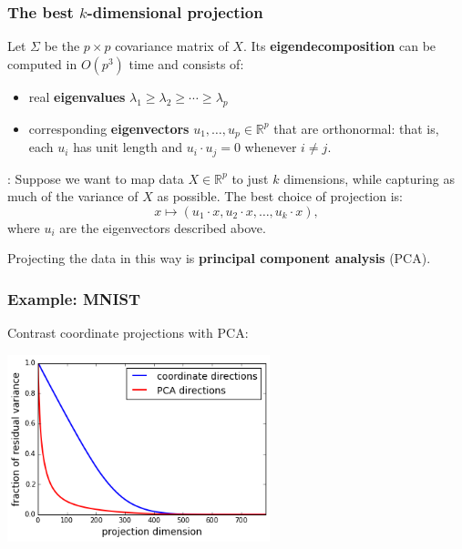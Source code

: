 \documentclass[smaller,handout]{beamer}
\def\R{{\mathbb R}}
\def\darkred{\color{red!70!black}}
\def\v2{{\vskip.2in}}
\def\R{{\mathbb R}}
\begin{document}
\begin{frame}
\frametitle{The best $k$-dimensional projection}

Let $\Sigma$ be the $p \times p$ covariance matrix of $X$. Its {\bf eigendecomposition} 
can be computed in $O(p^3)$ time and consists of:
\begin{itemize}
\item real {\bf eigenvalues} $\lambda_1 \geq \lambda_2 \geq \cdots \geq \lambda_p$
\item corresponding {\bf eigenvectors} $u_1, \ldots, u_p \in \R^p$ that are orthonormal: that is, each $u_i$ has unit length and $u_i \cdot u_j = 0$ whenever $i \neq j$.
\end{itemize}

\pause\v2
{\darkred {\bf Theorem}: Suppose we want to map data $X \in \R^p$ to just $k$ dimensions,
while capturing as much of the variance of $X$ as possible. The best choice of 
projection is:
$$ x \mapsto (u_1 \cdot x, u_2 \cdot x, \ldots, u_k \cdot x),$$
where $u_i$ are the eigenvectors described above.}

\pause\v2
\alert{Projecting the data in this way is {\bf principal component analysis} (PCA).}

\end{frame}

\begin{frame}
\frametitle{Example: MNIST}

Contrast coordinate projections with PCA:

\begin{center}
\includegraphics[width=3in]{mnist-compare.png}
\end{center}

\end{frame}
\end{document}
